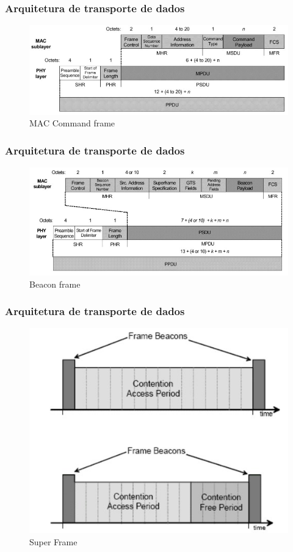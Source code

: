 \documentclass{beamer}
\begin{document}
  \frame
  {
    \frametitle{Arquitetura de transporte de dados}
    \begin{figure}[ht!]
	  \centering
	  \includegraphics[width=.8\textwidth]{figuras/maccommandframe}
	  \caption{MAC Command frame}
	  \label{fig:comandframe}
    \end{figure}
  }

  \frame
  {
    \frametitle{Arquitetura de transporte de dados}
    \begin{figure}[ht!]
	  \centering
	  \includegraphics[width=.8\textwidth]{figuras/beaconframe}
	  \caption{Beacon frame}
	  \label{fig:beacon}
    \end{figure}
  }

    \frame
  {
    \frametitle{Arquitetura de transporte de dados}
    \begin{figure}[ht!]
	  \centering
	  \includegraphics[width=.7\textwidth]{figuras/superframe}
	  \caption{Super Frame}
	  \label{fig:superframe}
    \end{figure}
  }
\end{document}
